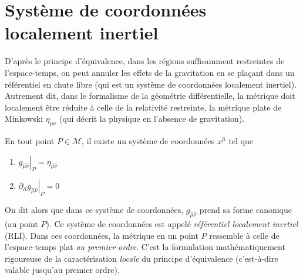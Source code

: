 \section{Système de coordonnées localement inertiel}
D'après le principe d'équivalence, dans les régions suffisamment restreintes de l'espace-temps, on peut annuler les effets de la gravitation en se plaçant dans un référentiel en chute libre (qui est un système de coordonnées localement inertiel). Autrement dit, dans le formalisme de la géométrie différentielle, la métrique doit localement être réduite à celle de la relativité restreinte, la métrique plate de Minkowski $\eta_{\mu\nu}$ (qui décrit la physique en l'absence de gravitation). 

\begin{theoremframe}
    \begin{propri}
        \label{prop: PE}
        En tout point $P \in \mathcal{M}$, il existe un système de coordonnées $x^{\hat{\mu}}$ tel que
       \begin{enumerate}[label = \roman*.]
           \item $\left. g_{\hat{\mu}\hat{\nu}} \right|_P = \eta_{\hat{\mu}\hat{\nu}}$
           \item $ \left. \partial_{\hat{\alpha}}g_{\hat{\mu}\hat{\nu}} \right|_P=0$
           \label{Propriété 4.1}
       \end{enumerate}
       \label{localement métrique de Minkowski}
    \end{propri}    
\end{theoremframe}
On dit alors que dans ce système de coordonnées, $g_{\hat{\mu}\hat{\nu}}$ prend sa forme canonique (au point $P$). Ce système de coordonnées est appelé \textit{référentiel localement inertiel} (RLI). Dans ces coordonnées, la métrique en un point $P$ ressemble à celle de l'espace-temps plat \emph{au premier ordre}. C'est la formulation mathématiquement rigoureuse de la caractérisation \emph{locale} du principe d'équivalence (c'est-à-dire valable jusqu'au premier ordre).

